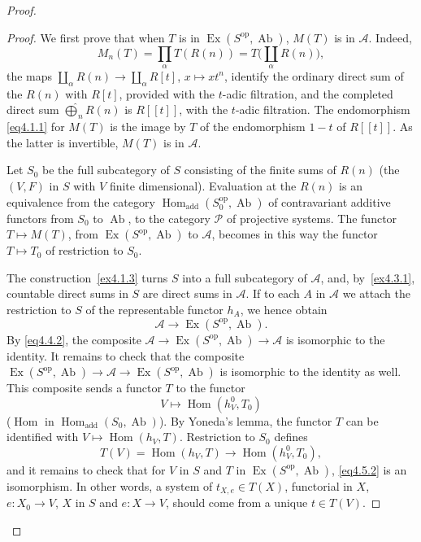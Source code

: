 \documentclass[11pt,a4paper]{article}
\theoremstyle{plain}
\theoremstyle{definition}
\DeclareMathOperator{\Hom}{Hom}
\DeclareMathOperator{\Ex}{Ex}
\DeclareMathOperator{\Ab}{Ab}
\DeclareMathOperator{\add}{add}
\newcommand{\op}{\mathrm{op}}
\numberwithin{equation}{section}
\begin{document}
\begin{proof}
\begin{proof}
We first prove that when $T$ is in $\Ex(S^{\op},\Ab)$, $M(T)$ is in $\mathcal{A}$. Indeed,
\begin{equation*}
M_{n}(T) = \prod_{\alpha} T(R(n)) = T\Big(\coprod_{\alpha} R(n)\Big),
\end{equation*}
the maps $\coprod_{\alpha} R(n) \to \coprod_{\alpha} R[t]$, $x \mapsto xt^{n}$, identify the ordinary direct sum of the $R(n)$ with $R[t]$, provided with the $t$-adic filtration, and the completed direct sum $\widehat{\bigoplus}_{n} R(n)$ is $R[[t]]$, with the $t$-adic filtration. The endomorphism \eqref{eq4.1.1} for $M(T)$ is the image by $T$ of the endomorphism $1-t$ of $R[[t]]$. As the latter is invertible, $M(T)$ is in $\mathcal{A}$.

Let $S_{0}$ be the full subcategory of $S$ consisting of the finite sums of $R(n)$ (the $(V,F)$ in $S$ with $V$ finite dimensional). Evaluation at the $R(n)$ is an equivalence from the category $\Hom_{\add}(S_{0}^{\op},\Ab)$ of contravariant additive functors from $S_{0}$ to $\Ab$, to the category $\mathcal{P}$ of projective systems. The functor $T \mapsto M(T)$, from $\Ex(S^{\op},\Ab)$ to $\mathcal{A}$, becomes in this way the functor $T \mapsto T_{0}$ of restriction to $S_{0}$.

The construction~\ref{ex4.1.3} turns $S$ into a full subcategory of $\mathcal{A}$, and, by~\ref{ex4.3.1}, countable direct sums in $S$ are direct sums in $\mathcal{A}$. If to each $A$ in $\mathcal{A}$ we attach the restriction to $S$ of the representable functor $h_{A}$, we hence obtain
\begin{equation*}
\mathcal{A} \to \Ex(S^{\op},\Ab).
\end{equation*}
By \eqref{eq4.4.2}, the composite $\mathcal{A} \to \Ex(S^{\op},\Ab) \to \mathcal{A}$ is isomorphic to the identity. It remains to check that the composite $\Ex(S^{\op},\Ab) \to \mathcal{A} \to \Ex(S^{\op},\Ab)$ is isomorphic to the identity as well. This composite sends a functor $T$ to the functor
\begin{equation*}
V \mapsto \Hom(h_{V}^{0}, T_{0})
\end{equation*}
($\Hom$ in $\Hom_{\add}(S_{0},\Ab)$). By Yoneda's lemma, the functor $T$ can be identified with $V \mapsto \Hom(h_{V}, T)$. Restriction to $S_{0}$ defines
\begin{equation}\label{eq4.5.2}
T(V) = \Hom(h_{V}, T) \to \Hom(h_{V}^{0}, T_{0}),
\tag{4.5.2}
\end{equation}
and it remains to check that for $V$ in $S$ and $T$ in $\Ex(S^{\op},\Ab)$, \eqref{eq4.5.2} is an isomorphism. In other words, a system of $t_{X,e} \in T(X)$, functorial in $X$, $e: X_{0} \to V$, $X$ in $S$ and $e: X \to V$, should come from a unique $t \in T(V)$.


\end{proof}
\end{proof}
\end{document}
